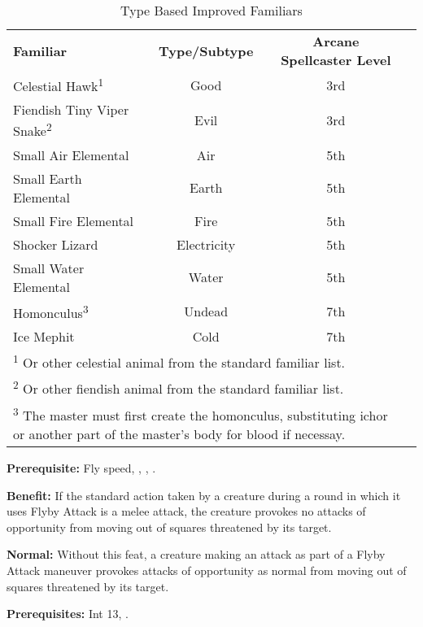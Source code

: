 \begin{table}[htb]
\caption{Type Based Improved Familiars}
\centering
\begin{tabular}{l c c c}
\textbf{Familiar} & \textbf{Type/Subtype} & \textbf{Arcane Spellcaster Level}\\
Celestial Hawk\textsuperscript{1} & Good & 3rd\\
Fiendish Tiny Viper Snake\textsuperscript{2} & Evil & 3rd\\
Small Air Elemental & Air & 5th\\
Small Earth Elemental & Earth & 5th\\
Small Fire Elemental & Fire & 5th\\
Shocker Lizard & Electricity & 5th\\
Small Water Elemental & Water & 5th\\
Homonculus\textsuperscript{3} & Undead & 7th\\
Ice Mephit & Cold & 7th\\
\multicolumn{3}{l}{\textsuperscript{1} Or other celestial animal from the standard familiar list.}\\
\multicolumn{3}{l}{\textsuperscript{2} Or other fiendish animal from the standard familiar list.}\\
\multicolumn{3}{p{9cm}}{\textsuperscript{3} The master must first create the homonculus, substituting ichor or another part of the master's body for blood if necessay.}\\
\end{tabular}
\end{table}


\textbf{Prerequisite:} Fly speed, , , . 

\textbf{Benefit:} If the standard action taken by a creature during a round in 
which it uses Flyby Attack is a melee attack, the creature provokes no attacks 
of opportunity from moving out of squares threatened by its target.

\textbf{Normal:} Without this feat, a creature making an attack as part of a Flyby 
Attack maneuver provokes attacks of opportunity as normal from moving out of squares 
threatened by its target.


\textbf{Prerequisites:} Int 13, .

